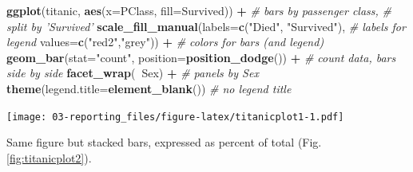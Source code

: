 \documentclass[]{book}
\newenvironment{Shaded}{\begin{snugshade}}{\end{snugshade}}
\newcommand{\CommentTok}[1]{\textcolor[rgb]{0.56,0.35,0.01}{\textit{#1}}}
\newcommand{\DataTypeTok}[1]{\textcolor[rgb]{0.13,0.29,0.53}{#1}}
\newcommand{\KeywordTok}[1]{\textcolor[rgb]{0.13,0.29,0.53}{\textbf{#1}}}
\newcommand{\NormalTok}[1]{#1}
\newcommand{\OperatorTok}[1]{\textcolor[rgb]{0.81,0.36,0.00}{\textbf{#1}}}
\newcommand{\StringTok}[1]{\textcolor[rgb]{0.31,0.60,0.02}{#1}}
\begin{document}
\begin{Shaded}
\begin{Highlighting}[]
\KeywordTok{ggplot}\NormalTok{(titanic, }\KeywordTok{aes}\NormalTok{(}\DataTypeTok{x=}\NormalTok{PClass, }\DataTypeTok{fill=}\NormalTok{Survived)) }\OperatorTok{+}\StringTok{        }\CommentTok{# bars by passenger class,}
\StringTok{                                                       }\CommentTok{# split by 'Survived'  }
\StringTok{  }\KeywordTok{scale_fill_manual}\NormalTok{(}\DataTypeTok{labels=}\KeywordTok{c}\NormalTok{(}\StringTok{"Died"}\NormalTok{, }\StringTok{"Survived"}\NormalTok{),      }\CommentTok{# labels for legend}
                    \DataTypeTok{values=}\KeywordTok{c}\NormalTok{(}\StringTok{"red2"}\NormalTok{,}\StringTok{"grey"}\NormalTok{)) }\OperatorTok{+}\StringTok{         }\CommentTok{# colors for bars (and legend)}
\StringTok{  }\KeywordTok{geom_bar}\NormalTok{(}\DataTypeTok{stat=}\StringTok{"count"}\NormalTok{, }\DataTypeTok{position=}\KeywordTok{position_dodge}\NormalTok{()) }\OperatorTok{+}\StringTok{  }\CommentTok{# count data, bars side by side}
\StringTok{  }\KeywordTok{facet_wrap}\NormalTok{(}\OperatorTok{~}\NormalTok{Sex) }\OperatorTok{+}\StringTok{                                   }\CommentTok{# panels by Sex}
\StringTok{  }\KeywordTok{theme}\NormalTok{(}\DataTypeTok{legend.title=}\KeywordTok{element_blank}\NormalTok{())                  }\CommentTok{# no legend title}
\end{Highlighting}
\end{Shaded}

\texttt{[image: 03-reporting\_files/figure-latex/titanicplot1-1.pdf]}

Same figure but stacked bars, expressed as percent of total (Fig. \ref{fig:titanicplot2}).
\end{document}
